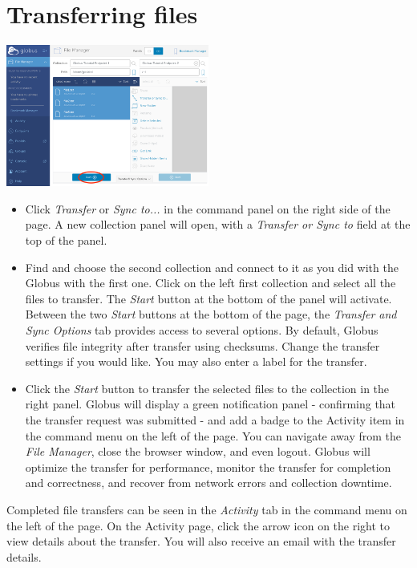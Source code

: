 \section{Transferring files}\label{file-transfer}

\begin{center}
\includegraphics[width=0.5\textwidth]{img/filetransfer-2.png}
\end{center}

\begin{itemize}
\item Click \emph{Transfer} or \emph{Sync to...} in the command panel on the 
right side of the page. A new collection panel will open, with a \emph{Transfer or Sync to} 
field at the top of the panel.
\item Find and choose the second collection and connect to it as you did with the 
Globus with the first one. Click on the left first collection and select all the 
files to transfer. The \emph{Start} button at the bottom of the panel will activate.
Between the two \emph{Start} buttons at the bottom of the page, the \emph{Transfer 
and Sync Options} tab provides access to several options. By default, Globus verifies 
file integrity after transfer using checksums. Change the transfer settings if 
you would like. You may also enter a label for the transfer.
\item Click the \emph{Start} button to transfer the selected files to the 
collection in the right panel. Globus will display a green notification panel - confirming 
that the transfer request was submitted - and add a badge to the Activity item in the 
command menu on the left of the page.
You can navigate away from the \emph{File Manager}, close the browser window, and 
even logout. Globus will optimize the transfer for performance, monitor the transfer 
for completion and correctness, and recover from network errors and collection downtime.
\end{itemize}

Completed file transfers can be seen in the \emph{Activity} tab in the command menu 
on the left of the page. On the Activity page, click the arrow icon on the right to 
view details about the transfer. You will also receive an email with the transfer details.

